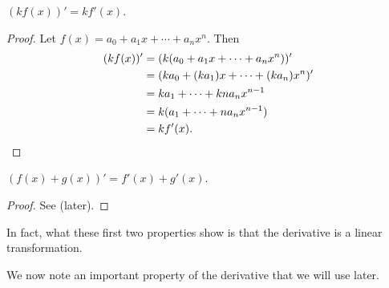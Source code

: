\begin{proposition}
    $(kf(x))' = kf'(x)$.
\end{proposition}
\begin{proof}
    Let $f(x) = a_0 + a_1x + \cdots + a_nx^n$. Then
    \begin{align*}
        (kf(x))' &= (k(a_0 + a_1x + \cdots + a_nx^n))'\\
        &= (ka_0 + (ka_1)x + \cdots + (ka_n)x^n)'\\
        &= ka_1 + \cdots + kna_nx^{n-1}\\
        &= k(a_1 + \cdots + na_nx^{n-1})\\
        &= kf'(x).\qedhere
    \end{align*}
\end{proof}

\begin{proposition}
    $(f(x) + g(x))' = f'(x) + g'(x)$.
\end{proposition}
\begin{proof}
    See  (later).
\end{proof}

\begin{remark}
    In fact, what these first two properties show is that the derivative is a linear transformation.
\end{remark}



We now note an important property of the derivative that we will use later.

